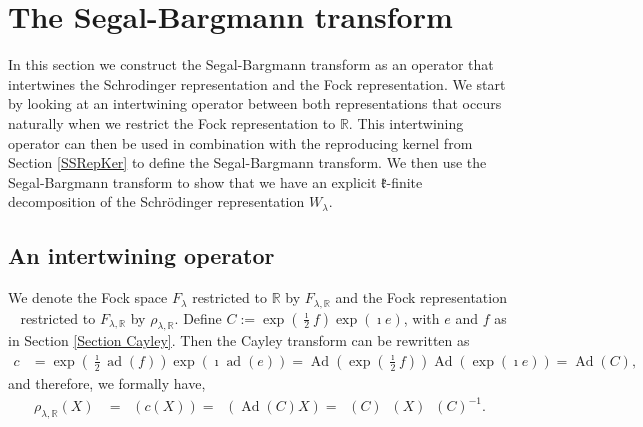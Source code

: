 \documentclass{amsart}
\numberwithin{theorem}{section}
\theoremstyle{definition}
\theoremstyle{remark}
\def\R{\mathds{R} }
\DeclareMathOperator{\ad}{ad}
\newcommand{\mf}[1]{\mathfrak{#1}}
\DeclareMathOperator{\pil}{\pi_\lambda}
\DeclareMathOperator{\rol}{\rho_\lambda}
\DeclareMathOperator{\Ad}{Ad}
\begin{document}
\section{The Segal-Bargmann transform}
\label{Section SB transform}
In this section we construct the Segal-Bargmann transform as an operator that intertwines the Schrodinger representation and the Fock representation. We start by looking at an intertwining operator between both representations that occurs naturally when we restrict the Fock representation to $\R$. This intertwining operator can then be used in combination with the reproducing kernel from Section \ref{SSRepKer} to define the Segal-Bargmann transform. We then use the Segal-Bargmann transform to show that we have an explicit $\mf{k}$-finite decomposition of the Schr\"odinger representation $W_\lambda$.

\subsection{An intertwining operator}\label{SSIntOp}
\label{Subsection intertwiner}

\begingroup
\allowdisplaybreaks
We denote the Fock space $F_\lambda$ restricted to $\R$ by $F_{\lambda,\R}$ and the Fock representation $\rol$ restricted to $F_{\lambda,\R}$ by $\rho_{\lambda,\R}$. Define $C := \exp(\frac{\imath}{2}f)\exp(\imath e)$, with $e$ and $f$ as in Section \ref{Section Cayley}. Then the Cayley transform can be rewritten as
\begin{align*}
c &= \exp(\frac{\imath}{2}\ad(f))\exp(\imath\ad(e)) = \Ad(\exp(\frac{\imath}{2}f))\Ad(\exp(\imath e)) = \Ad(C),
\end{align*}
and therefore, we formally have,
\begin{align}\label{Eq Int}
\rho_{\lambda,\R}(X) &= \pil(c(X)) = \pil(\Ad(C)X) = \pil(C)\pil(X)\pil(C)^{-1}.
\end{align}
\end{document}
